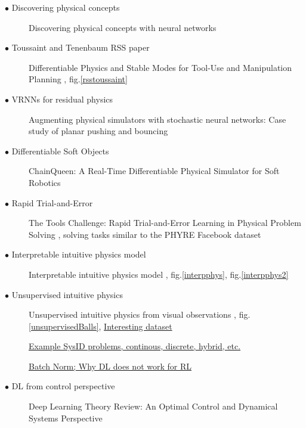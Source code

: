 \documentclass[12pt]{article}
\begin{document}
\begin{description}
  \item[$\bullet$ Discovering physical concepts] Discovering physical concepts with neural networks \cite{iten2018discovering}
  \item[$\bullet$ Toussaint and Tenenbaum RSS paper] Differentiable Physics and Stable Modes for
Tool-Use and Manipulation Planning \cite{toussaint2018differentiable}, fig.\ref{rsstoussaint}
  \item[$\bullet$ VRNNs for residual physics] Augmenting physical simulators with stochastic neural networks: Case study of planar pushing and bouncing \cite{ajay2018augmenting}
  \item[$\bullet$ Differentiable Soft Objects] ChainQueen: A Real-Time Differentiable Physical Simulator for Soft Robotics \cite{hu2018chainqueen}
  \item[$\bullet$ Rapid Trial-and-Error] The Tools Challenge: Rapid
    Trial-and-Error Learning in Physical Problem Solving \cite{allen2019tools},
    solving tasks similar to the PHYRE Facebook dataset \cite{bakhtin2019phyre}
  \item[$\bullet$ Interpretable intuitive physics model] Interpretable intuitive
    physics model \cite{ye2018interpretable}, fig.\ref{interpphys}, fig.\ref{interpphys2}
  \item[$\bullet$ Unsupervised intuitive physics] Unsupervised intuitive physics
    from visual observations \cite{ehrhardt2018unsupervised},
    fig.\ref{unsupervisedBalls},
    \href{https://geometry.cs.ucl.ac.uk/projects/2018/unsupervised-intuitive-physics/}{Interesting
    dataset}

    \href{https://ths.rwth-aachen.de/research/projects/hypro/benchmarks-of-continuous-and-hybrid-systems/}{Example
      SysID problems, continous, discrete, hybrid, etc.}
    
    \href{https://myrtle.ai/how-to-train-your-resnet-7-batch-norm/}{Batch Norm;
      Why DL does not work for RL}


  \item[$\bullet$ DL from control perspective] Deep Learning Theory Review: An Optimal Control and Dynamical Systems Perspective \cite{liu2019deep}

    
\end{description}
\end{document}
